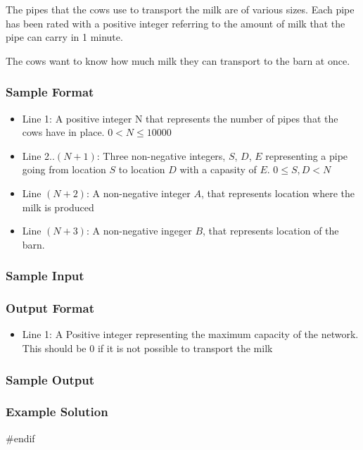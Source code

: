 The pipes that the cows use to transport the milk are of various sizes.
Each pipe has been rated with a positive integer referring to the amount of milk that the pipe can carry in 1 minute.

The cows want to know how much milk they can transport to the barn at once.
\subsubsection{Sample Format}
\begin{itemize}
	\item Line 1: A positive integer N  that represents the number of pipes that the cows have in place. $0 < N \leq 10000$
	\item Line 2..$(N+1)$: Three non-negative integers, $S$, $D$, $E$ representing a pipe going from location $S$ to location $D$ with a capasity of $E$. $0 \leq S,D < N$
	\item Line $(N+2)$: A non-negative integer $A$, that represents location where the milk is produced
	\item Line $(N+3)$: A non-negative ingeger $B$, that represents location of the barn.
\end{itemize}

\subsubsection{Sample Input}

\subsubsection{Output Format}
\begin{itemize}
	\item Line 1: A Positive integer representing the maximum capacity of the network. 
				  This should be 0 if it is not possible to transport the milk
\end{itemize}
\subsubsection{Sample Output}
\subsubsection{Example Solution}
#endif

